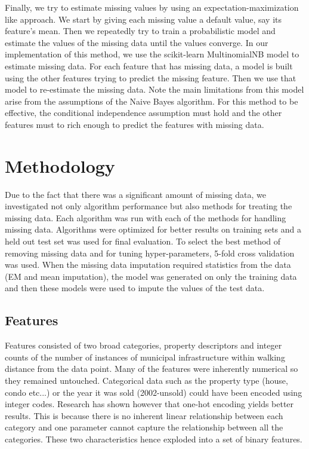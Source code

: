 \documentclass{acm_proc_article-sp}
\begin{document}
	Finally, we try to estimate missing values by using an expectation-maximization like approach. We start by giving each missing value a default value, say its feature's mean. Then we repeatedly try to train a probabilistic model and estimate the values of the missing data until the values converge. In our implementation of this method, we use the scikit-learn MultinomialNB model to estimate missing data. For each feature that has missing data, a model is built using the other features trying to predict the missing feature. Then we use that model to re-estimate the missing data. Note the main limitations from this model arise from the assumptions of the Naive Bayes algorithm. For this method to be effective, the conditional independence assumption must hold and the other features must to rich enough to predict the features with missing data.
	
\section{Methodology} %
	
	Due to the fact that there was a significant amount of missing data, we investigated not only algorithm performance but also methods for treating the missing data. Each algorithm was run with each of the methods for handling missing data. Algorithms were optimized for better results on training sets and a held out test set was used for final evaluation. To select the best method of removing missing data and for tuning hyper-parameters, 5-fold cross validation was used. When the missing data imputation required statistics from the data (EM and mean imputation), the model was generated on only the training data and then these models were used to impute the values of the test data.
	
\subsection{Features} %
	
	Features consisted of two broad categories, property descriptors and integer counts of the number of instances of municipal infrastructure within walking distance from the data point. Many of the features were inherently numerical so they remained untouched. Categorical data such as the property type (house, condo etc...) or the year it was sold (2002-unsold) could have been encoded using integer codes. Research has shown however that one-hot encoding yields better results. \cite{onehot} This is because there is no inherent linear relationship between each category and one parameter cannot capture the relationship between all the categories. These two characteristics hence exploded into a set of binary features.
	
\end{document}

